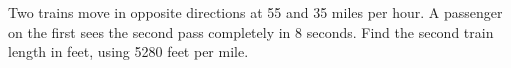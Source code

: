 Two trains move in opposite directions at 55 and 35 miles per hour. A passenger on the first sees the second pass completely in 8 seconds. Find the second train length in feet, using 5280 feet per mile.
